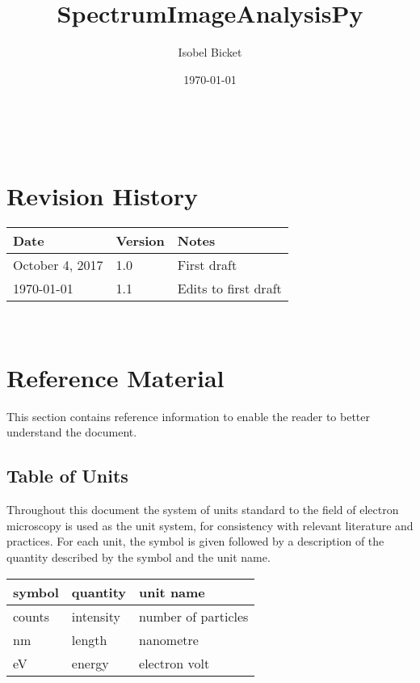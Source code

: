 \documentclass[12pt]{article}
\begin{document}
\label{doc:SRS}

\title{SpectrumImageAnalysisPy} 
\author{Isobel Bicket}
\date{\today}
	
\maketitle

~\newpage



\section{Revision History}

\begin{tabularx}{\textwidth}{p{4cm}p{2cm}X}
	\toprule {\bf Date} & {\bf Version} & {\bf Notes}\\
	\midrule
	October 4, 2017  & 1.0 & First draft\\
	\today & 1.1 & Edits to first draft\\
	\bottomrule
\end{tabularx}

~\newpage

\tableofcontents

\section{Reference Material}

This section contains reference information to enable the reader to better
understand the document.

\subsection{Table of Units}
\label{TableUnits}

Throughout this document the system of units standard to the field of electron
microscopy is used
as the unit system, for consistency with relevant literature and practices. For
each unit, the symbol is given followed by a
description of the quantity described by the symbol and the unit name.
~\newline

\renewcommand{\arraystretch}{1.2}
  \noindent \begin{tabular}{l l l} 
    \toprule		
    \textbf{symbol} & \textbf{quantity} & \textbf{unit name}\\
    \midrule 
    counts & intensity & number of particles\\
    \si{\nano\metre} & length & nanometre\\
    \si{\electronvolt} & energy	& electron volt\\
    \bottomrule
  \end{tabular}
\end{document}
